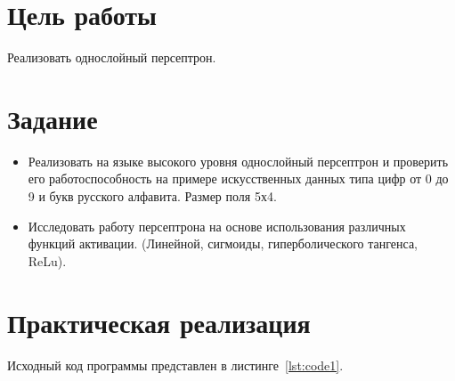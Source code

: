 \documentclass[a4paper, 14pt]{extarticle}
\begin{document}
\renewcommand{\ttdefault}{pcr}

\setlength{\tabcolsep}{3pt}
\newpage
\setcounter{page}{2}

\section{Цель работы}\label{Sect::goal}

Реализовать однослойный персептрон.

\section{Задание}\label{Sect::task}

\begin{itemize}
    \item Реализовать на языке высокого уровня однослойный персептрон и проверить его работоспособность на примере искусственных данных типа цифр от 0 до 9 и букв русского алфавита. Размер поля 5х4.
    \item Исследовать работу персептрона на основе использования различных функций активации. (Линейной, сигмоиды, гиперболического тангенса, ReLu).
\end{itemize}

\section{Практическая реализация}\label{Sect::code}

Исходный код программы представлен в листинге~\ref{lst:code1}.
\end{document}
